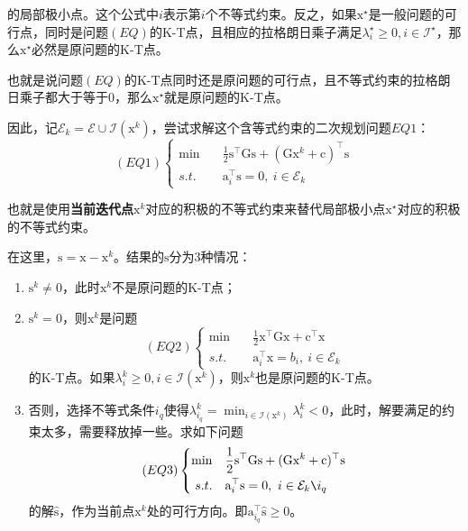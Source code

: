 \documentclass[a4paper]{D:/repositories/MyDGP/latex/PaperReadingLog}
\begin{document}
的局部极小点。这个公式中$i$表示第$i$个不等式约束。反之，如果$\mathrm{x}^\star$是一般问题的可行点，同时是问题$(EQ)$的K-T点，且相应的拉格朗日乘子满足$\lambda^\star_i\ge 0,i\in\mathcal{I}^\star$，那么$\mathrm{x}^\star$必然是原问题的K-T点。

也就是说问题$(EQ)$的K-T点同时还是原问题的可行点，且不等式约束的拉格朗日乘子都大于等于0，那么$\mathrm{x}^\star$就是原问题的K-T点。

因此，记$\mathcal{E}_k=\mathcal{E}\cup\mathcal{I}(\mathrm{x}^k)$，尝试求解这个含等式约束的二次规划问题$EQ1$：
$$
(EQ1)\left\{\begin{aligned}
    \min\quad &\frac{1}{2}\mathrm{s}^\top \mathrm{G}\mathrm{s}+(\mathrm{G}\mathrm{x}^k+\mathrm{c})^\top \mathrm{s}\\
    s.t.\quad &\mathrm{a}_i^\top\mathrm{s}=0,\ i\in\mathcal{E}_k
\end{aligned}
\right.
$$

也就是使用\textbf{当前迭代点}$\mathrm{x}^k$对应的积极的不等式约束来替代局部极小点$\mathrm{x}^\star$对应的积极的不等式约束。

在这里，$\mathrm{s}=\mathrm{x}-\mathrm{x}^k$。结果的$\mathrm{s}$分为3种情况：
\begin{enumerate}
    \item $\mathrm{s}^k\neq 0$，此时$\mathrm{x}^k$不是原问题的K-T点；
    \item $\mathrm{s}^k=0$，则$\mathrm{x}^k$是问题
    $$
    (EQ2)\left\{\begin{aligned}
        \min\quad &\frac{1}{2}\mathrm{x}^\top \mathrm{G}\mathrm{x}+\mathrm{c}^\top \mathrm{x}\\
        s.t.\quad &\mathrm{a}_i^\top\mathrm{x}=b_i,\ i\in\mathcal{E}_k
    \end{aligned}
    \right.
    $$
    的K-T点。如果$\lambda_i^k\ge 0,i\in\mathcal{I}(\mathrm{x}^k)$，则$\mathrm{x}^k$也是原问题的K-T点。
    \item 否则，选择不等式条件$i_q$使得$\lambda_{i_q}^k=\min_{i\in\mathcal{I}(\mathrm{x}^k)}\lambda_i^k<0$，此时，解要满足的约束太多，需要释放掉一些。求如下问题
    $$
    (EQ3)\left\{\begin{aligned}
        \min\quad &\frac{1}{2}\mathrm{s}^\top \mathrm{G}\mathrm{s}+(\mathrm{G}\mathrm{x}^k+\mathrm{c})^\top \mathrm{s}\\
        s.t.\quad &\mathrm{a}_i^\top\mathrm{s}=0,\ i\in\mathcal{E}_k\verb|\|{i_q}
    \end{aligned}
    \right.
    $$
    的解$\hat{\mathrm{s}}$，作为当前点$\mathrm{x}^k$处的可行方向。即$\mathrm{a}_{i_q}^\top \hat{\mathrm{s}}\ge 0$。
\end{enumerate}
\end{document}
